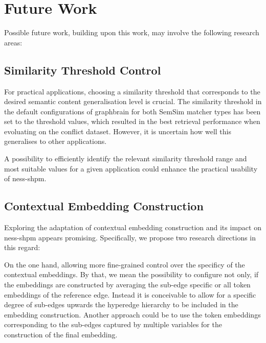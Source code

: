 \documentclass[11pt]{scrreprt}
\begin{document}
{\begin{enumerate}[label=\textbf{C.\arabic*}, leftmargin=0pt, labelwidth=*, align=left, labelsep=0.5em, itemindent=0pt, listparindent=\parindent]
\end{enumerate}


\section{Future Work}
Possible future work, building upon this work, may involve the following research areas:

\subsection{Similarity Threshold Control}
For practical applications, choosing a similarity threshold that corresponds to the desired semantic content generalisation level is crucial. The similarity threshold in the default configurations of graphbrain for both SemSim matcher types has been set to the threshold values, which resulted in the best retrieval performance when evoluating on the conflict dataset. However, it is uncertain how well this generalises to other applications.

A possibility to efficiently identify the relevant similarity threshold range and most suitable values for a given application could enhance the practical usability of \gls{ness-shpm}.

%


\subsection{Contextual Embedding Construction}
Exploring the adaptation of contextual embedding construction and its impact on \gls{ness-shpm} appears promising. Specifically, we propose two research directions in this regard:

On the one hand, allowing more fine-grained control over the specificy of the contextual embeddings. By that, we mean the possibility to configure not only, if the embeddings are constructed by averaging the sub-edge specific or all token embeddings of the reference edge. Instead it is conceivable to allow for a specific degree of sub-edges upwards the hyperedge hierarchy to be included in the embedding construction. Another approach could be to use the token embeddings corresponding to the sub-edges captured by multiple variables for the construction of the final embedding.

}
\end{document}
